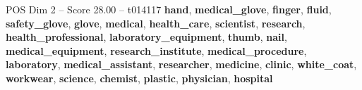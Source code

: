 \begin{textsample}{POS Dim 2 – Score 28.00 – t014117}  \label{ex:f2_pos_040}
\textbf{hand}, \textbf{medical\_glove}, \textbf{finger}, \textbf{fluid}, \textbf{safety\_glove}, \textbf{glove}, \textbf{medical}, \textbf{health\_care}, \textbf{scientist}, \textbf{research}, \textbf{health\_professional}, \textbf{laboratory\_equipment}, \textbf{thumb}, \textbf{nail}, \textbf{medical\_equipment}, \textbf{research\_institute}, \textbf{medical\_procedure}, \textbf{laboratory}, \textbf{medical\_assistant}, \textbf{researcher}, \textbf{medicine}, \textbf{clinic}, \textbf{white\_coat}, \textbf{workwear}, \textbf{science}, \textbf{chemist}, \textbf{plastic}, \textbf{physician}, \textbf{hospital}

\end{textsample}
